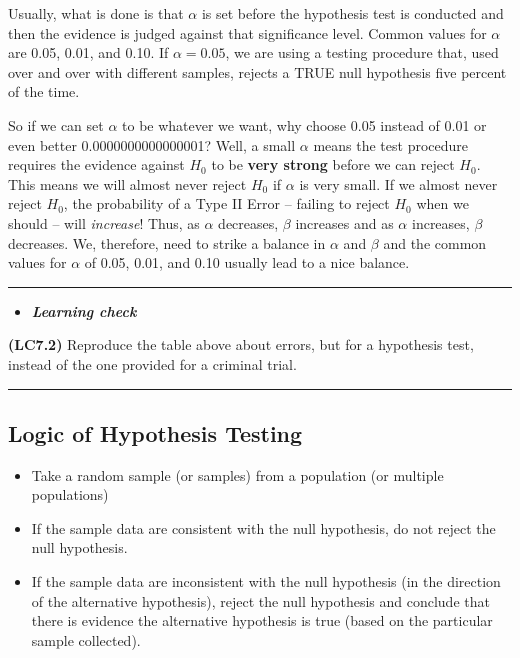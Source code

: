 \documentclass[]{tufte-book}
\let\oldrule=\rule
\renewcommand{\rule}[1]{\oldrule{\linewidth}}
\providecommand{\tightlist}{%
  \setlength{\itemsep}{0pt}\setlength{\parskip}{0pt}}
\newenvironment{rmdblock}[1]
  {\begin{shaded*}
  \begin{itemize}
  \renewcommand{\labelitemi}{
    \raisebox{-.7\height}[0pt][0pt]{
    }
  }
  \item
  }
  {
  \end{itemize}
  \end{shaded*}
  }
\newenvironment{learncheck}
  {\begin{rmdblock}{warning}}
  {\end{rmdblock}}
\begin{document}
Usually, what is done is that \(\alpha\) is set before the hypothesis
test is conducted and then the evidence is judged against that
significance level. Common values for \(\alpha\) are 0.05, 0.01, and
0.10. If \(\alpha = 0.05\), we are using a testing procedure that, used
over and over with different samples, rejects a TRUE null hypothesis
five percent of the time.

So if we can set \(\alpha\) to be whatever we want, why choose 0.05
instead of 0.01 or even better 0.0000000000000001? Well, a small
\(\alpha\) means the test procedure requires the evidence against
\(H_0\) to be \textbf{very strong} before we can reject \(H_0\). This
means we will almost never reject \(H_0\) if \(\alpha\) is very small.
If we almost never reject \(H_0\), the probability of a Type II Error --
failing to reject \(H_0\) when we should -- will \emph{increase}! Thus,
as \(\alpha\) decreases, \(\beta\) increases and as \(\alpha\)
increases, \(\beta\) decreases. We, therefore, need to strike a balance
in \(\alpha\) and \(\beta\) and the common values for \(\alpha\) of
0.05, 0.01, and 0.10 usually lead to a nice balance.

\begin{center}\rule{0.5\linewidth}{\linethickness}\end{center}

\begin{learncheck}
\textbf{\emph{Learning check}}
\end{learncheck}

\textbf{(LC7.2)} Reproduce the table above about errors, but for a
hypothesis test, instead of the one provided for a criminal trial.

\begin{center}\rule{0.5\linewidth}{\linethickness}\end{center}

\subsection{Logic of Hypothesis
Testing}\label{logic-of-hypothesis-testing}

\begin{itemize}
\tightlist
\item
  Take a random sample (or samples) from a population (or multiple
  populations)
\item
  If the sample data are consistent with the null hypothesis, do not
  reject the null hypothesis.
\item
  If the sample data are inconsistent with the null hypothesis (in the
  direction of the alternative hypothesis), reject the null hypothesis
  and conclude that there is evidence the alternative hypothesis is true
  (based on the particular sample collected).
\end{itemize}
\end{document}

